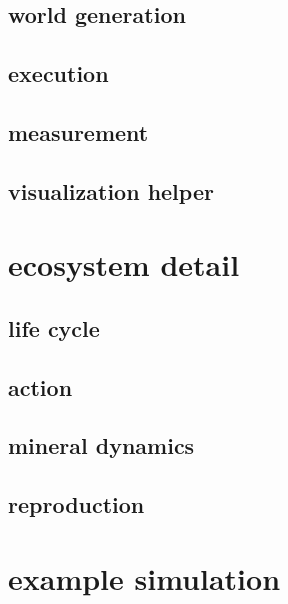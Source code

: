 \documentclass{amsart}
\theoremstyle{definition}
\theoremstyle{remark}
\numberwithin{equation}{section}
\begin{document}
\subsection{world generation} 

\subsection{execution} 

\subsection{measurement}

\subsection{visualization helper}



\section{ecosystem detail} 
\subsection{life cycle}

\subsection{action}

\subsection{mineral dynamics}

\subsection{reproduction}
\section{example simulation}
\end{document}
